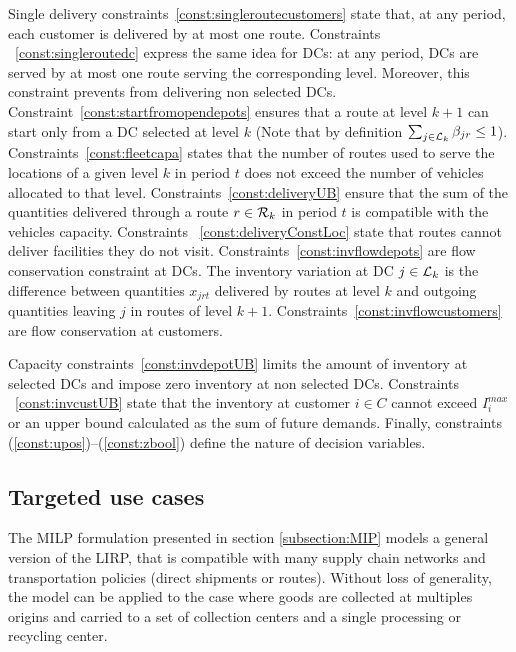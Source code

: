 \documentclass[a4paper,10pt]{article}
\begin{document}
\begin{linenumbers}
Single delivery constraints~\eqref{const:singleroutecustomers} state that, at any period, each customer is delivered by at most one route. 
%
Constraints ~\eqref{const:singleroutedc} express the same idea for DCs: at any period, DCs are served by at most one route serving the corresponding level. Moreover, this constraint prevents from delivering non selected DCs. 
%
Constraint~\eqref{const:startfromopendepots} ensures that a route at level $k+1$ can start only from a DC selected at level $k$ (Note that by definition $\sum_{j\in\mathcal{L}_{k}} \beta_{jr} \leq 1$).
%
Constraints~\eqref{const:fleetcapa} states that the number of routes used to serve the locations of a given level $k$ in period $t$ does not exceed the number of vehicles allocated to that level. 
%
Constraints~\eqref{const:deliveryUB} ensure that the sum of the quantities delivered through a route $r\in\mathcal{R}_k$ in period $t$ is compatible with the vehicles capacity. 
%
Constraints ~\eqref{const:deliveryConstLoc}  state that routes cannot deliver facilities they do not visit. 
%
Constraints~\eqref{const:invflowdepots} are flow conservation constraint at DCs. 
The inventory variation at DC $j \in \mathcal{L}_k$ is the difference between quantities $x_{jrt}$ delivered by routes at level $k$ and outgoing quantities leaving $j$ in routes of level $k+1$. 
%
Constraints~\eqref{const:invflowcustomers} are flow conservation at customers.

%
Capacity constraints~\eqref{const:invdepotUB} limits the amount of inventory at selected DCs and impose zero inventory at non selected DCs. 
%
Constraints ~\eqref{const:invcustUB} state that the inventory at customer $i \in C$ cannot exceed $I_i^{max}$ or an upper bound calculated as the sum of future demands. 
%
Finally, constraints (\ref{const:upos})--(\ref{const:zbool}) define the nature of decision variables. 







\subsection{Targeted use cases}

The MILP formulation presented in section \ref{subsection:MIP} models a general version of the LIRP, 
that is compatible with many supply chain networks and transportation policies (direct shipments or routes). 
Without loss of generality, the model can be applied to the case where goods are collected at multiples origins and carried to a set of collection centers and a single processing or recycling center. 


\end{linenumbers}
\end{document}
